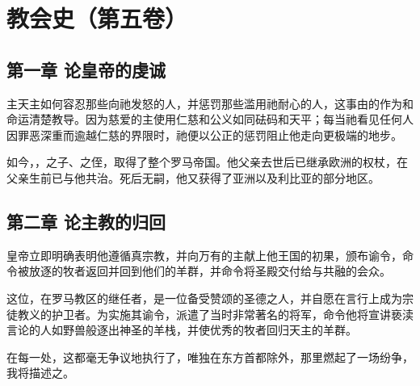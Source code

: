 

\section{教会史（第五卷）}


\subsection{第一章 论皇帝的虔诚}

主天主如何容忍那些向祂发怒的人，并惩罚那些滥用祂耐心的人，这事由的作为和命运清楚教导。因为慈爱的主使用仁慈和公义如同砝码和天平；每当祂看见任何人因罪恶深重而逾越仁慈的界限时，祂便以公正的惩罚阻止他走向更极端的地步。\par

如今，，之子、之侄，取得了整个罗马帝国。他父亲去世后已继承欧洲的权杖，在父亲生前已与他共治。死后无嗣，他又获得了亚洲以及利比亚的部分地区。\par


\subsection{第二章 论主教的归回}

皇帝立即明确表明他遵循真宗教，并向万有的主献上他王国的初果，颁布谕令，命令被放逐的牧者返回并回到他们的羊群，并命令将圣殿交付给与共融的会众。\par

这位，在罗马教区的继任者，是一位备受赞颂的圣德之人，并自愿在言行上成为宗徒教义的护卫者。为实施其谕令，派遣了当时非常著名的将军，命令他将宣讲亵渎言论的人如野兽般逐出神圣的羊栈，并使优秀的牧者回归天主的羊群。\par

在每一处，这都毫无争议地执行了，唯独在东方首都除外，那里燃起了一场纷争，我将描述之。\par

